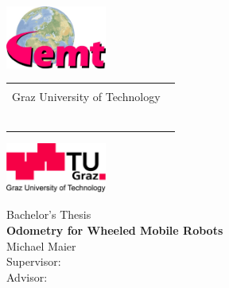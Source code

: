 
\begin{titlepage}

  \begin{center}
    \begin{minipage}[htb]{18cm}
      \hspace*{-2.6cm}
      \includegraphics[width=3.3cm]{./figures/logos/EMT.jpg}
      \begin{tabular}{p{10cm}}\centering{
      \Large Institute of Electrical Measurement and Measurement Signal Processing\\ Graz University of Technology
      ~\\
      ~\\}
      \end{tabular}
      \includegraphics[width=3.3cm]{./figures/logos/TUG.jpg}
    \end{minipage}

    \Large {Bachelor's Thesis\\} %
    \vspace*{1cm} \huge{\textbf{Odometry for Wheeled Mobile Robots}\\}
    \vspace*{1.0cm} 
    \Large{Michael Maier\\} \vspace*{1cm}
    \Large{Supervisor: \\} \vspace*{0.5cm}%
    \Large{Advisor: \\} \vspace*{1.5cm}%



\end{center}
\end{titlepage}
